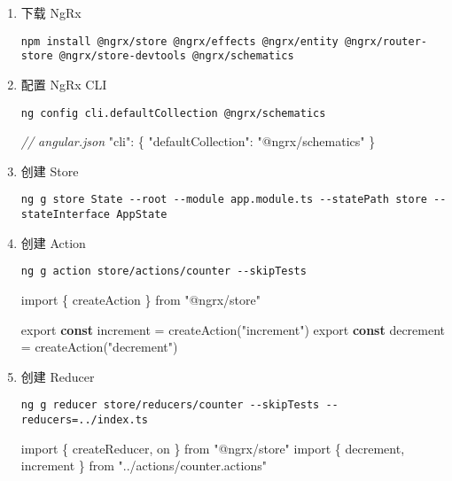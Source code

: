\documentclass[
]{article}
\newenvironment{Shaded}{}{}
\newcommand{\CommentTok}[1]{\textcolor[rgb]{0.38,0.63,0.69}{\textit{#1}}}
\newcommand{\FunctionTok}[1]{\textcolor[rgb]{0.02,0.16,0.49}{#1}}
\newcommand{\ImportTok}[1]{#1}
\newcommand{\KeywordTok}[1]{\textcolor[rgb]{0.00,0.44,0.13}{\textbf{#1}}}
\newcommand{\NormalTok}[1]{#1}
\newcommand{\OperatorTok}[1]{\textcolor[rgb]{0.40,0.40,0.40}{#1}}
\newcommand{\StringTok}[1]{\textcolor[rgb]{0.25,0.44,0.63}{#1}}
\begin{document}
\begin{enumerate}
\def\labelenumi{\arabic{enumi}.}
\item
  下载 NgRx

  \texttt{npm\ install\ @ngrx/store\ @ngrx/effects\ @ngrx/entity\ @ngrx/router-store\ @ngrx/store-devtools\ @ngrx/schematics}
\item
  配置 NgRx CLI

  \texttt{ng\ config\ cli.defaultCollection\ @ngrx/schematics}

\begin{Shaded}
\begin{Highlighting}[]
\CommentTok{// angular.json}
\StringTok{"cli"}\OperatorTok{:}\NormalTok{ \{}
  \StringTok{"defaultCollection"}\OperatorTok{:} \StringTok{"@ngrx/schematics"}
\NormalTok{\}}
\end{Highlighting}
\end{Shaded}
\item
  创建 Store

  \texttt{ng\ g\ store\ State\ -\/-root\ -\/-module\ app.module.ts\ -\/-statePath\ store\ -\/-stateInterface\ AppState}
\item
  创建 Action

  \texttt{ng\ g\ action\ store/actions/counter\ -\/-skipTests}

\begin{Shaded}
\begin{Highlighting}[]
\ImportTok{import}\NormalTok{ \{ createAction \} }\ImportTok{from} \StringTok{"@ngrx/store"}

\ImportTok{export} \KeywordTok{const}\NormalTok{ increment }\OperatorTok{=} \FunctionTok{createAction}\NormalTok{(}\StringTok{"increment"}\NormalTok{)}
\ImportTok{export} \KeywordTok{const}\NormalTok{ decrement }\OperatorTok{=} \FunctionTok{createAction}\NormalTok{(}\StringTok{"decrement"}\NormalTok{)}
\end{Highlighting}
\end{Shaded}
\item
  创建 Reducer

  \texttt{ng\ g\ reducer\ store/reducers/counter\ -\/-skipTests\ -\/-reducers=../index.ts}

\begin{Shaded}
\begin{Highlighting}[]
\ImportTok{import}\NormalTok{ \{ createReducer}\OperatorTok{,}\NormalTok{ on \} }\ImportTok{from} \StringTok{"@ngrx/store"}
\ImportTok{import}\NormalTok{ \{ decrement}\OperatorTok{,}\NormalTok{ increment \} }\ImportTok{from} \StringTok{"../actions/counter.actions"}


\end{Highlighting}
\end{Shaded}
\end{enumerate}
\end{document}
